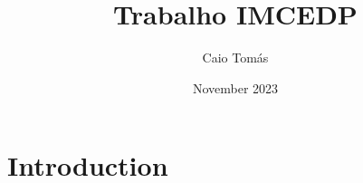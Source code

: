 \documentclass{article}
\title{Trabalho IMCEDP}
\author{Caio Tomás}
\date{November 2023}
\begin{document}
\maketitle

\section{Introduction}
\end{document}
